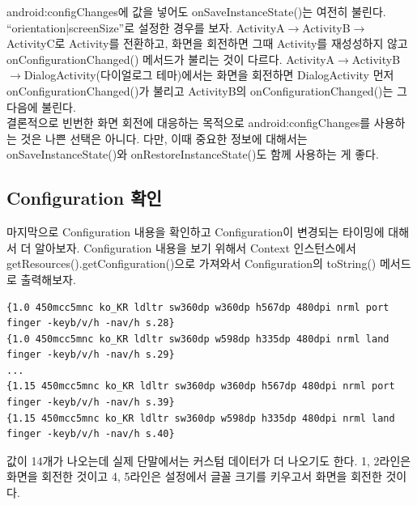 android:configChanges에 값을 넣어도 onSaveInstanceState()는 여전히 불린다. ``orientation|screen\-Size''로 설정한 경우를 보자.
ActivityA$\rightarrow$ActivityB$\rightarrow$ActivityC로 Activity를 전환하고, 화면을 회전하면 그때 Activity를 재성성하지 않고 onConfigurationChanged() 메서드가 불리는 것이 다르다.
ActivityA$\rightarrow$ActivityB$\rightarrow$Dia\-logActivity(다이얼로그 테마)에서는 화면을 회전하면 DialogActivity 먼저 onConfigurationChanged()가 불리고 ActivityB의 onConfigurationChanged()는 그 다음에 불린다.\\

결론적으로 빈번한 화면 회전에 대응하는 목적으로 android:configChanges를 사용하는 것은 나쁜 선택은 아니다.
다만, 이때 중요한 정보에 대해서는 onSaveInstanceState()와  onRestoreInstanceState()도 함께 사용하는 게 좋다.

\subsection{Configuration 확인}
마지막으로 Configuration 내용을 확인하고 Configuration이 변경되는 타이밍에 대해서 더 알아보자.
Configuration 내용을 보기 위해서 Context 인스턴스에서 getResources().getConfigura\-tion()으로 가져와서 Configuration의 toString() 메서드로 출력해보자.
\begin{lstlisting}[frame=single]
{1.0 450mcc5mnc ko_KR ldltr sw360dp w360dp h567dp 480dpi nrml port finger -keyb/v/h -nav/h s.28}
{1.0 450mcc5mnc ko_KR ldltr sw360dp w598dp h335dp 480dpi nrml land finger -keyb/v/h -nav/h s.29}
...
{1.15 450mcc5mnc ko_KR ldltr sw360dp w360dp h567dp 480dpi nrml port finger -keyb/v/h -nav/h s.39}
{1.15 450mcc5mnc ko_KR ldltr sw360dp w598dp h335dp 480dpi nrml land finger -keyb/v/h -nav/h s.40}
\end{lstlisting}
값이 14개가 나오는데 실제 단말에서는 커스텀 데이터가 더 나오기도 한다. 1, 2라인은 화면을 회전한 것이고 4, 5라인은 설정에서 글꼴 크기를 키우고서 화면을 회전한 것이다.
